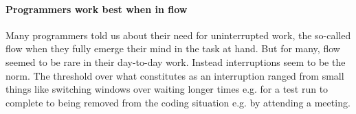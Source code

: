 \paragraph{Programmers work best when in flow} Many programmers told us about their need for uninterrupted work, the so-called flow when they fully emerge their mind in the task at hand. But for many, flow seemed to be rare in their day-to-day work. Instead interruptions seem to be the norm. The threshold over what constitutes as an interruption ranged from small things like switching windows over waiting longer times e.g. for a test run to complete to being removed from the coding situation e.g. by attending a meeting.